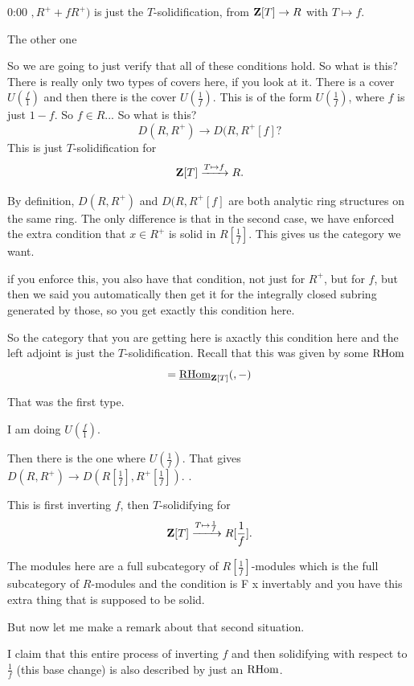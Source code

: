 \begin{unfinished}{0:00}
$, R^+ + fR^+)$ is just the $T$-solidification, from $\mathbf Z[T] \to R$ with $T \mapsto f$. 

The other one


So we are going to just verify that all of these conditions hold. So what is this?
There is really only two types of covers here, if you look at it. There is a cover $U(\frac{f}{1})$ and then there is the cover $U(\frac{1}{f})$.
This  is of the form $U(\frac{1}{f})$, where $f$ is just $1-f$.
So $f \in R$... So what is this?
\[
D(R,R^+) \to D(R, R^+[f] ?
\]
This is just $T$-solidification for
\[
\mathbf Z[T] \xrightarrow{T \mapsto f} R.
\]

By definition, $D(R,R^+)$ and $D(R, R^+[f]$  are both analytic ring structures on the same ring. The only difference is that in the second case, we have enforced the extra condition that $x \in R^+$ is solid in $R[\frac{1}{f}]$. This gives us the category we want.


if you enforce this, you also have that condition, not just for $R^+$, but for $f$, but then we said you automatically then get it for the integrally closed subring generated by those, so you get exactly this condition here.

So the category that you are getting here is axactly this condition here and the left adjoint is just the $T$-solidification. 
Recall that this was given by some $\operatorname{RHom}$
\[
= \operatorname{\underline{RHom}}_{\mathbf Z[T]} (,-)
\]

That was the first type.

I am doing $U(\frac{f}{1})$.

Then there is the one where $U(\frac{1}{f})$. That gives $D(R, R^+) \to D(R[\frac{1}{f}], R^+[\frac{1}{f}] )$. . 

This is first inverting $f$, then $T$-solidifying for
\[
\mathbf Z[T] \xrightarrow{T \mapsto \frac{1}{f}} R[\frac{1}{f}].
\]
 
The modules here  are a full subcategory of $R[\frac{1}{f}]$-modules which is the full subcategory of $R$-modules and the condition is F x  invertably and you have this extra thing that is supposed to be solid.

But now let me make a remark about that second situation.

% 
I claim that this entire process of inverting $f$ and then solidifying with respect to $\frac{1}{f}$ (this base change) is also described by just an $\operatorname{RHom}$. 


\end{unfinished}
